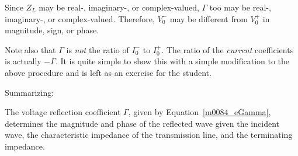 Since $Z_L$ may be real-, imaginary-, or complex-valued, $\Gamma$ too may be real-, imaginary-, or complex-valued. 
Therefore, $V_0^-$ may be different from $V_0^+$ in magnitude, sign, or phase.  

Note also that $\Gamma$ is \emph{not} the ratio of $I_0^-$ to $I_0^+$.  
The ratio of the \emph{current} coefficients is actually $-\Gamma$.
It is quite simple to show this with a simple modification to the above procedure and is left as an exercise for the student.

Summarizing:
%
\begin{mdframed}[backgroundcolor=yellow!20,nobreak=true] 
The voltage reflection coefficient 
$\Gamma$, given by Equation~\ref{m0084_eGamma}, determines the magnitude and phase of the reflected wave given the incident wave, the characteristic impedance of the transmission line, and the terminating impedance. 
\end{mdframed}

